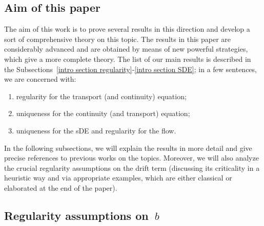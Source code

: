\documentclass[a4paper,10pt]{article}
\newcommand\1{\mathbbm{1}}
\numberwithin{equation}{section}
\begin{document}
\subsection{Aim of this paper}

The aim of this work is to prove several results in this direction and develop a sort of comprehensive theory on this topic. The results in this paper are considerably advanced and are obtained by means of new powerful strategies, which give a more complete theory. The list of our main results is described in the Subsections~\ref{intro section regularity}-\ref{intro section SDE}; in a few sentences, we are concerned with:
\begin{enumerate}[font=\normalfont, label=(\roman{*}), ref=(\roman{*})]
\item regularity for the transport (and continuity) equation;
\item uniqueness for the continuity (and transport) equation;
\item uniqueness for the sDE and regularity for the flow.
\end{enumerate}

In the following subsections, we will explain the results in more detail and give precise references to previous works on the topics. Moreover, we will also analyze the crucial regularity assumptions on the drift term (discussing its criticality in a heuristic way and via appropriate examples, which are either classical or elaborated at the end of the paper).

\subsection{Regularity assumptions on~$b$}
\end{document}
